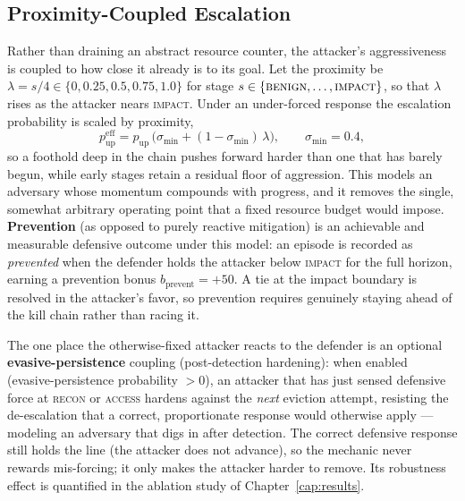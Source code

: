 \subsection{Proximity-Coupled Escalation}\label{ssec:proximity_coupled}
Rather than draining an abstract resource counter, the attacker's aggressiveness is coupled to how close it already is to its goal. Let the proximity be $\lambda = s / 4 \in \{0, 0.25, 0.5, 0.75, 1.0\}$ for stage $s \in \{\textsc{benign}, \dots, \textsc{impact}\}$, so that $\lambda$ rises as the attacker nears \textsc{impact}. Under an under-forced response the escalation probability is scaled by proximity,
\begin{equation}\label{eq:proximity_coupling}
p_{\mathrm{up}}^{\mathrm{eff}} = p_{\mathrm{up}}\,\bigl(\sigma_{\min} + (1-\sigma_{\min})\,\lambda\bigr), \qquad \sigma_{\min} = 0.4,
\end{equation}
so a foothold deep in the chain pushes forward harder than one that has barely begun, while early stages retain a residual floor of aggression. This models an adversary whose momentum compounds with progress, and it removes the single, somewhat arbitrary operating point that a fixed resource budget would impose. \textbf{Prevention} (as opposed to purely reactive mitigation) is an achievable and measurable defensive outcome under this model: an episode is recorded as \emph{prevented} when the defender holds the attacker below \textsc{impact} for the full horizon, earning a prevention bonus $b_{\mathrm{prevent}} = +50$. A tie at the impact boundary is resolved in the attacker's favor, so prevention requires genuinely staying ahead of the kill chain rather than racing it.

The one place the otherwise-fixed attacker reacts to the defender is an optional \textbf{evasive-persistence} coupling (post-detection hardening): when enabled (evasive-persistence probability $>0$), an attacker that has just sensed defensive force at \textsc{recon} or \textsc{access} hardens against the \emph{next} eviction attempt, resisting the de-escalation that a correct, proportionate response would otherwise apply --- modeling an adversary that digs in after detection. The correct defensive response still holds the line (the attacker does not advance), so the mechanic never rewards mis-forcing; it only makes the attacker harder to remove. Its robustness effect is quantified in the ablation study of Chapter~\ref{cap:results}.


